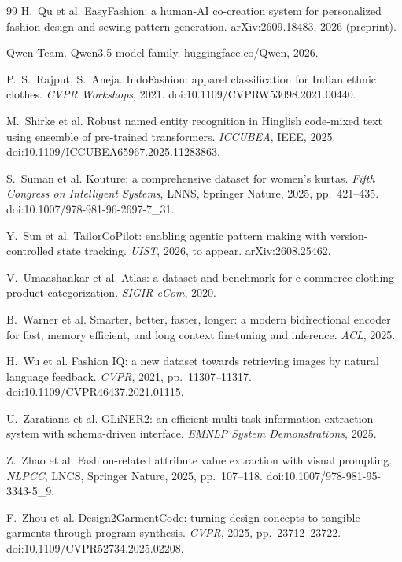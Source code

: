 \begin{thebibliography}{99}
 H.~Qu et al. EasyFashion: a human-AI co-creation system for personalized fashion design and sewing pattern generation. arXiv:2609.18483, 2026 (preprint).

 Qwen Team. Qwen3.5 model family. huggingface.co/Qwen, 2026.

 P.~S.~Rajput, S.~Aneja. IndoFashion: apparel classification for Indian ethnic clothes. \emph{CVPR Workshops}, 2021. doi:10.1109/CVPRW53098.2021.00440.

 M.~Shirke et al. Robust named entity recognition in Hinglish code-mixed text using ensemble of pre-trained transformers. \emph{ICCUBEA}, IEEE, 2025. doi:10.1109/ICCUBEA65967.2025.11283863.

 S.~Suman et al. Kouture: a comprehensive dataset for women's kurtas. \emph{Fifth Congress on Intelligent Systems}, LNNS, Springer Nature, 2025, pp.~421--435. doi:10.1007/978-981-96-2697-7\_31.

 Y.~Sun et al. TailorCoPilot: enabling agentic pattern making with version-controlled state tracking. \emph{UIST}, 2026, to appear. arXiv:2608.25462.

 V.~Umaashankar et al. Atlas: a dataset and benchmark for e-commerce clothing product categorization. \emph{SIGIR eCom}, 2020.

 B.~Warner et al. Smarter, better, faster, longer: a modern bidirectional encoder for fast, memory efficient, and long context finetuning and inference. \emph{ACL}, 2025.

 H.~Wu et al. Fashion IQ: a new dataset towards retrieving images by natural language feedback. \emph{CVPR}, 2021, pp.~11307--11317. doi:10.1109/CVPR46437.2021.01115.

 U.~Zaratiana et al. GLiNER2: an efficient multi-task information extraction system with schema-driven interface. \emph{EMNLP System Demonstrations}, 2025.

 Z.~Zhao et al. Fashion-related attribute value extraction with visual prompting. \emph{NLPCC}, LNCS, Springer Nature, 2025, pp.~107--118. doi:10.1007/978-981-95-3343-5\_9.

 F.~Zhou et al. Design2GarmentCode: turning design concepts to tangible garments through program synthesis. \emph{CVPR}, 2025, pp.~23712--23722. doi:10.1109/CVPR52734.2025.02208.

\end{thebibliography}
\endgroup

